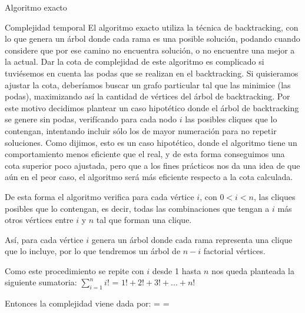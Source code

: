 \begin{section}{Algoritmo exacto}
\begin{subsection}{Complejidad temporal}
		El algoritmo exacto utiliza la técnica de backtracking, con lo que genera un árbol donde cada rama es una posible solución, podando cuando considere que por ese camino no encuentra solución, o no encuentre una mejor a la actual.
		Dar la cota de complejidad de este algoritmo es complicado si tuviésemos en cuenta las podas que se realizan en el backtracking. Si quisieramos ajustar la cota, deberíamos buscar un grafo particular tal que las minimice (las podas), maximizando así la cantidad de vértices del árbol de backtracking.
		Por este motivo decidimos plantear un caso hipotético donde el árbol de backtracking se genere sin podas, verifícando para cada nodo $i$ las posibles cliques que lo contengan, intentando incluir sólo los de mayor numeración para no repetir soluciones. Como dijimos, esto es un caso hipotético, donde el algoritmo tiene un comportamiento menos eficiente que el real, y de esta forma conseguimos una cota superior poco ajustada, pero que a los fines prácticos nos da una idea de que aún en el peor caso, el algoritmo será más eficiente respecto a la cota calculada. 

		De esta forma el algoritmo verifica para cada vértice $i$, con $0 < i < n$, las cliques posibles que lo contengan, es decir, todas las combinaciones que tengan a $i$ más otros vértices entre $i$ y $n$ tal que forman una clique.

		Así, para cada vértice $i$ genera un árbol donde cada rama representa una clique que lo incluye, por lo que tendremos un árbol de $n-i$ factorial vértices.

		Como este procedimiento se repite con $i$ desde 1 hasta $n$ nos queda planteada la siguiente sumatoria: $\sum_{i=1}^{n}{i!}$ = $1! + 2! + 3! + ... + n!$

		Entonces la complejidad viene dada por: = = 
		
		
		\end{subsection}
\end{section}


